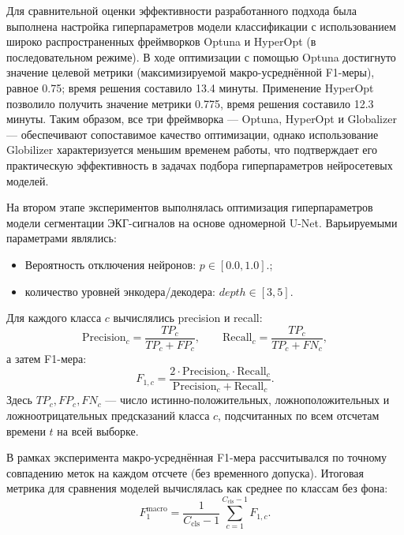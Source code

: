 \documentclass[11pt, oneside, a4paper]{article}
\begin{document}


Для сравнительной оценки эффективности разработанного подхода была выполнена настройка гиперпараметров модели классификации с использованием широко распространенных фреймворков Optuna и HyperOpt (в последовательном режиме). В ходе оптимизации с помощью Optuna достигнуто значение целевой метрики (максимизируемой макро-усреднённой F1-меры), равное 0.75; время решения составило 13.4 минуты. Применение HyperOpt позволило получить значение метрики 0.775, время решения составило 12.3 минуты. Таким образом, все три фреймворка --- Optuna, HyperOpt и Globalizer --- обеспечивают сопоставимое качество оптимизации, однако использование Globilizer характеризуется меньшим временем работы, что подтверждает его практическую эффективность в задачах подбора гиперпараметров нейросетевых моделей.


На втором этапе экспериментов выполнялась оптимизация гиперпараметров модели сегментации ЭКГ-сигналов на основе одномерной U-Net. Варьируемыми параметрами являлись:
\begin{itemize}
    \item Вероятность отключения нейронов: $p \in [0.0, 1.0]$.;
    \item количество уровней энкодера/декодера: $depth \in [3, 5]$.
\end{itemize}


Для каждого класса $c$ вычислялись precision и recall:
\[
\mathrm{Precision}_c=\frac{TP_c}{TP_c+FP_c}, \qquad
\mathrm{Recall}_c=\frac{TP_c}{TP_c+FN_c},
\]
а затем F1-мера:
\[
F_{1,c} = \frac{2\cdot \mathrm{Precision}_c\cdot \mathrm{Recall}_c}{\mathrm{Precision}_c+\mathrm{Recall}_c}.
\]
Здесь $TP_c, FP_c, FN_c$ --- число истинно-положительных, ложноположительных и ложноотрицательных предсказаний класса $c$,
подсчитанных по всем отсчетам времени $t$ на всей выборке.

В рамках эксперимента макро-усреднённая F1-мера рассчитывался по точному совпадению меток на каждом отсчете (без временного допуска).
Итоговая метрика для сравнения моделей вычислялась как среднее по классам без фона:
\[
F_1^{\mathrm{macro}} = \frac{1}{C_{\mathrm{cls}}-1}\sum_{c=1}^{C_{\mathrm{cls}}-1} F_{1,c}.
\]


\end{document}
